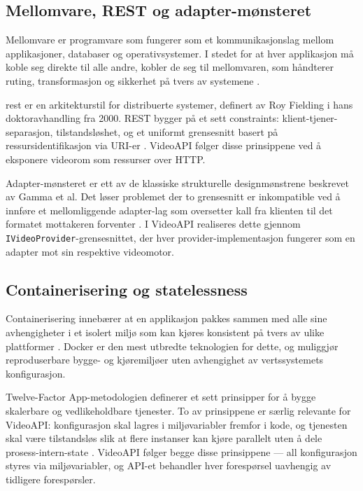 \subsection{Mellomvare, REST og adapter-mønsteret}
\label{subsec:mellomvare-rest-adapter}

Mellomvare er programvare som fungerer som et kommunikasjonslag mellom applikasjoner,
databaser og operativsystemer. I stedet for at hver applikasjon må koble seg direkte til
alle andre, kobler de seg til mellomvaren, som håndterer ruting, transformasjon og
sikkerhet på tvers av systemene \cite{azure_middleware}.

\gls{rest} er en arkitekturstil for distribuerte systemer,
definert av Roy Fielding i hans doktoravhandling fra 2000. REST bygger på et sett
constraints: klient-tjener-separasjon, tilstandsløshet, og et uniformt grensesnitt
basert på ressursidentifikasjon via URI-er \cite{wiki_rest}. VideoAPI følger disse
prinsippene ved å eksponere videorom som ressurser over HTTP.

Adapter-mønsteret er ett av de klassiske strukturelle designmønstrene beskrevet av
Gamma et al. Det løser problemet der to grensesnitt er inkompatible ved å innføre
et mellomliggende adapter-lag som oversetter kall fra klienten til det formatet
mottakeren forventer \cite{wiki_adapter}. I VideoAPI realiseres dette gjennom
\texttt{IVideoProvider}-grensesnittet, der hver provider-implementasjon fungerer som
en adapter mot sin respektive videomotor.

\subsection{Containerisering og statelessness}
\label{subsec:containerisering-statelessness}

Containerisering innebærer at en applikasjon pakkes sammen med alle sine avhengigheter
i et isolert miljø som kan kjøres konsistent på tvers av ulike plattformer \cite{docker_docs}.
Docker er den mest utbredte teknologien for dette, og muliggjør reproduserbare bygge-
og kjøremiljøer uten avhengighet av vertssystemets konfigurasjon.

Twelve-Factor App-metodologien definerer et sett prinsipper for å bygge skalerbare
og vedlikeholdbare tjenester. To av prinsippene er særlig relevante for VideoAPI:
konfigurasjon skal lagres i miljøvariabler fremfor i kode, og tjenesten skal være
tilstandsløs slik at flere instanser kan kjøre parallelt uten å dele \gls{prosess-intern-state} \cite{twelve_factor}. VideoAPI følger begge disse prinsippene — all konfigurasjon
styres via miljøvariabler, og API-et behandler hver forespørsel uavhengig av tidligere
forespørsler.

